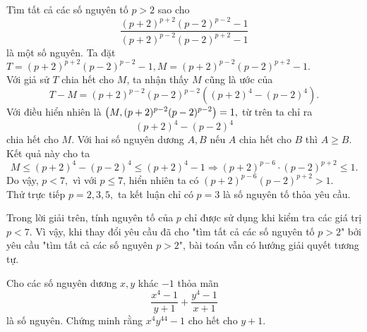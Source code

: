 \begin{gbtt}
Tìm tất cả các số nguyên tố $p>2$ sao cho $$\dfrac{(p+2)^{p+2}(p-2)^{p-2} - 1}{(p+2)^{p-2}(p-2)^{p+2}- 1} $$ là một số nguyên. 
\loigiai
{Ta đặt $T=(p+2)^{p+2}(p-2)^{p-2} - 1,M=(p+2)^{p-2}(p-2)^{p+2}- 1.$ \\
Với giả sử $T$ chia hết cho $M$, ta nhận thấy $M$ cũng là ước của
$$T-M= (p+2)^{p-2}(p-2)^{p-2} \left((p+2)^4 - (p-2)^4 \right).$$ 
Với điều hiển nhiên là $\left(\displaystyle M, (p+2)^{p-2}(p-2)^{p-2} \right)=1,$ từ trên ta chỉ ra
$$(p+2)^4 - (p-2)^4$$
chia hết cho $M.$ Với hai số nguyên dương $A,B$ nếu $A$ chia hết cho $B$ thì $A\ge B.$ Kết quả này cho ta
 $$M \leq (p+2)^4 - (p-2)^4 \leq (p+2)^4 - 1\Rightarrow (p+2)^{p-6} \cdot (p-2)^{p+2} \leq 1.$$
Do vậy, $p<7,$ vì với $p\leq 7$, hiển nhiên ta có $(p+2)^{p-6}(p-2)^{p+2} > 1.$\\ Thử trực tiếp $p=2,3,5,$ ta kết luận chỉ có $p=3$ là số nguyên tố thỏa yêu cầu.}
\begin{luuy}
\nx 	
Trong lời giải trên, tính nguyên tố của $p$ chỉ được sử dụng khi kiểm tra các giá trị $p<7$. Vì vậy, khi thay đổi yêu cầu đã cho "tìm tất cả các số nguyên tố $p>2$" bởi yêu cầu "tìm tất cả các số nguyên $p>2$", bài toán vẫn có hướng giải quyết tương tự.
\end{luuy}
\end{gbtt}

\begin{gbtt}
Cho các số nguyên dương $x,y$ khác $-1$ thỏa mãn
$$\dfrac{x^4-1}{y+1}+\dfrac{y^4-1}{x+1}$$
là số nguyên. Chứng minh rằng $x^4y^{44}-1$ cho hết cho $y+1.$
\end{gbtt}

